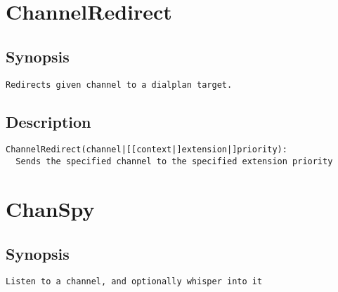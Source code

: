 \section{ChannelRedirect}
\subsection{Synopsis}
\begin{verbatim}
Redirects given channel to a dialplan target.
\end{verbatim}
\subsection{Description}
\begin{verbatim}
ChannelRedirect(channel|[[context|]extension|]priority):
  Sends the specified channel to the specified extension priority

\end{verbatim}


\section{ChanSpy}
\subsection{Synopsis}
\begin{verbatim}
Listen to a channel, and optionally whisper into it
\end{verbatim}

